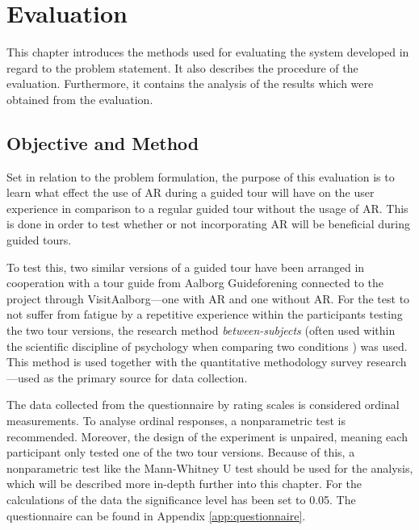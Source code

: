 \chapter{Evaluation}\label{ch:evaluation}
This chapter introduces the methods used for evaluating the system developed in regard to the problem statement. It also describes the procedure of the evaluation. Furthermore, it contains the analysis of the results which were obtained from the evaluation.

\section{Objective and Method} 
Set in relation to the problem formulation, the purpose of this evaluation is to learn what effect the use of AR during a guided tour will have on the user experience in comparison to a regular guided tour without the usage of AR. This is done in order to test whether or not incorporating AR will be beneficial during guided tours. 

To test this, two similar versions of a guided tour have been arranged in cooperation with a tour guide from Aalborg Guideforening connected to the project through VisitAalborg---one with AR and one without AR. For the test to not suffer from fatigue by a repetitive experience within the participants testing the two tour versions, the research method \textit{between-subjects} (often used within the scientific discipline of psychology when comparing two conditions \cite{Charness2012}) was used. This method is used together with the quantitative methodology survey research---used as the primary source for data collection.

The data collected from the questionnaire by rating scales is considered ordinal measurements. To analyse ordinal responses, a nonparametric test is recommended. Moreover, the design of the experiment is unpaired, meaning each participant only tested one of the two tour versions. Because of this, a nonparametric test like the Mann-Whitney U test should be used for the analysis, which will be described more in-depth further into this chapter. For the calculations of the data the significance level has been set to 0.05. The questionnaire can be found in Appendix \ref{app:questionnaire}.

